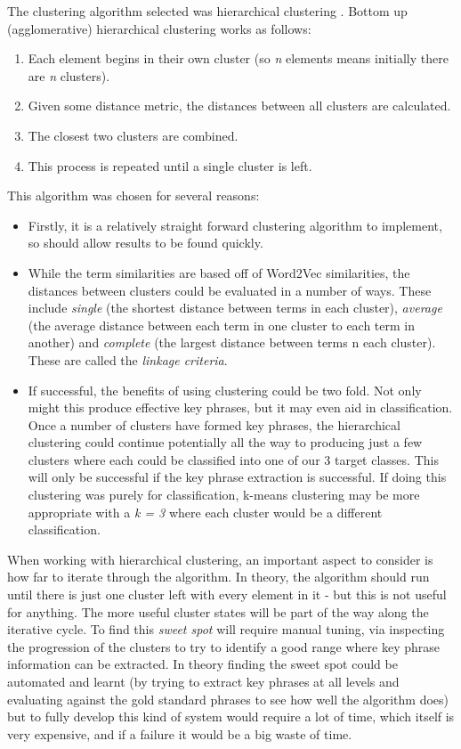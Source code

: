 The clustering algorithm selected was hierarchical clustering \cite{Rai2010}. Bottom up (agglomerative) hierarchical clustering works as follows:
\begin{enumerate}
	\item Each element begins in their own cluster (so \textit{n} elements means initially there are \textit{n} clusters).
	\item Given some distance metric, the distances between all clusters are calculated.
	\item The closest two clusters are combined.
	\item This process is repeated until a single cluster is left.
\end{enumerate}
\noindent This algorithm was chosen for several reasons:
\begin{itemize}
	\item Firstly, it is a relatively straight forward clustering algorithm to implement, so should allow results to be found quickly.
	\item While the term similarities are based off of Word2Vec similarities, the distances between clusters could be evaluated in a number of ways. These include \textit{single} (the shortest distance between terms in each cluster), \textit{average} (the average distance between each term in one cluster to each term in another) and \textit{complete} (the largest distance between terms n each cluster). These are called the \textit{linkage criteria}.
	\item If successful, the benefits of using clustering could be two fold. Not only might this produce effective key phrases, but it may even aid in classification. Once a number of clusters have formed key phrases, the hierarchical clustering could continue potentially all the way to producing just a few clusters where each could be classified into one of our 3 target classes. This will only be successful if the key phrase extraction is successful. If doing this clustering was purely for classification, k-means clustering may be more appropriate with a \textit{k = 3} where each cluster would be a different classification.
\end{itemize}

When working with hierarchical clustering, an important aspect to consider is how far to iterate through the algorithm. In theory, the algorithm should run until there is just one cluster left with every element in it - but this is not useful for anything. The more useful cluster states will be part of the way along the iterative cycle. To find this \textit{sweet spot} will require manual tuning, via inspecting the progression of the clusters to try to identify a good range where key phrase information can be extracted. In theory finding the sweet spot could be automated and learnt (by trying to extract key phrases at all levels and evaluating against the gold standard phrases to see how well the algorithm does) but to fully develop this kind of system would require a lot of time, which itself is very expensive, and if a failure it would be a big waste of time.

